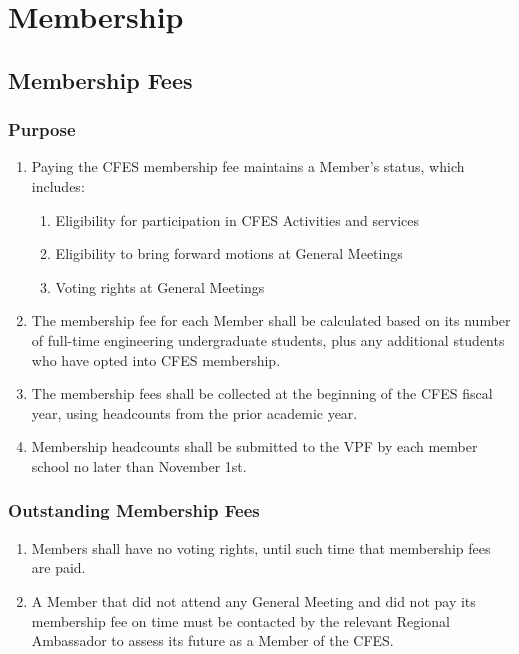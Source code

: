 \section{Membership}
\label{membership}

\subsection{Membership Fees}
\label{membership-membership-fees}

\subsubsection{Purpose}
\label{membership-fees-purpose}

\begin{enumerate}
 \item Paying the CFES membership fee maintains a Member’s status, which includes:
  \begin{enumerate}
   \item Eligibility for participation in CFES Activities and services
   \item Eligibility to bring forward motions at General Meetings
   \item Voting rights at General Meetings
  \end{enumerate}
 \item The membership fee for each Member shall be calculated based on its number of full-time engineering undergraduate students, plus any additional students who have opted into CFES membership.
 \item The membership fees shall be collected at the beginning of the CFES fiscal year, using headcounts from the prior academic year.
 \item Membership headcounts shall be submitted to the VPF by each member school no later than November 1st.
\end{enumerate}

\subsubsection{Outstanding Membership Fees}
\label{membership-fees-outstanding-membership-fees}

\begin{enumerate}
 \item Members shall have no voting rights, until such time that membership fees are paid.
 \item A Member that did not attend any General Meeting and did not pay its membership fee on time must be contacted by the relevant Regional Ambassador to assess its future as a Member of the CFES.
\end{enumerate}

